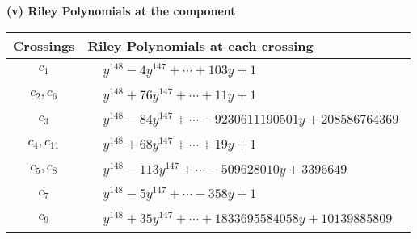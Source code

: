 \documentclass[1p]{elsarticle_modified}
\theoremstyle{definition}
\begin{document}
\newpage\renewcommand{\arraystretch}{1}
\flushleft \textbf{(v) Riley Polynomials at the component}\newline \\
\begin{tabular}{m{50pt}|m{274pt}}
Crossings & \hspace{64pt}Riley Polynomials at each crossing \\
\hline $$\begin{aligned}c_{1}\end{aligned}$$&$\begin{aligned}
&y^{148}-4 y^{147}+\cdots+103 y+1
\end{aligned}$\\
\hline $$\begin{aligned}c_{2},c_{6}\end{aligned}$$&$\begin{aligned}
&y^{148}+76 y^{147}+\cdots+11 y+1
\end{aligned}$\\
\hline $$\begin{aligned}c_{3}\end{aligned}$$&$\begin{aligned}
&y^{148}-84 y^{147}+\cdots-9230611190501 y+208586764369
\end{aligned}$\\
\hline $$\begin{aligned}c_{4},c_{11}\end{aligned}$$&$\begin{aligned}
&y^{148}+68 y^{147}+\cdots+19 y+1
\end{aligned}$\\
\hline $$\begin{aligned}c_{5},c_{8}\end{aligned}$$&$\begin{aligned}
&y^{148}-113 y^{147}+\cdots-509628010 y+3396649
\end{aligned}$\\
\hline $$\begin{aligned}c_{7}\end{aligned}$$&$\begin{aligned}
&y^{148}-5 y^{147}+\cdots-358 y+1
\end{aligned}$\\
\hline $$\begin{aligned}c_{9}\end{aligned}$$&$\begin{aligned}
&y^{148}+35 y^{147}+\cdots+1833695584058 y+10139885809
\end{aligned}$\\

\end{tabular}
\end{document}
